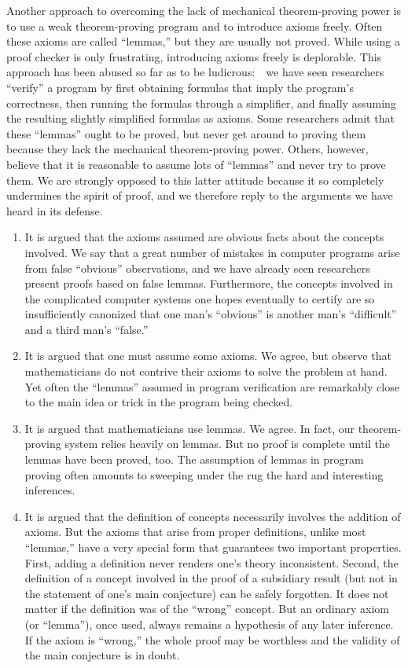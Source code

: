 \documentclass[11pt]{book}
\newenvironment{pubbullet}{\begin{enumerate}}{\end{enumerate}}
\begin{document}
Another approach to overcoming the lack of 
mechanical theorem-proving power is to use a weak theorem-proving program and to introduce axioms freely.
Often these axioms are  called ``lemmas,'' but they are
usually not  proved.  While using a proof checker is
only frustrating, introducing axioms freely is
deplorable.  
This approach has been abused so far as to be ludicrous:~~we have seen researchers ``verify''  a program
by first  obtaining formulas that imply the program's correctness,
then running the formulas
through a simplifier, and finally  assuming the resulting slightly simplified
formulas as axioms.  Some researchers admit
that these ``lemmas'' ought to be proved, but  never
get around to proving them because they lack the mechanical
theorem-proving power.  Others, however,  believe that
it is reasonable to assume lots of ``lemmas'' and never try
to prove them.  We are strongly opposed to this latter attitude
because it so completely undermines the spirit of
proof, and we therefore reply to the arguments
we have heard
in its defense.
\begin{pubbullet}
\item It is argued that the axioms assumed are obvious
facts about the concepts involved.  We say that a great number
of mistakes in computer programs arise from false ``obvious''
observations, and we have already seen  researchers
present proofs based on false lemmas.  Furthermore, the
concepts involved in the complicated computer systems
one hopes eventually to certify are so insufficiently
canonized that one man's ``obvious'' is another man's ``difficult''
and a third man's ``false.''
\item It is argued that one must assume some axioms.  We
agree, but observe that mathematicians do not contrive their
axioms to solve the problem at hand.  Yet often the ``lemmas''
assumed in program verification
are remarkably close to the main idea or trick in the
program being checked.
\item It is argued that
mathematicians use lemmas.  We agree. In fact,
our theorem-proving system relies heavily on lemmas.
But no proof is complete until 
the lemmas have  been proved, too.  The
assumption of lemmas in program proving often amounts to sweeping
under the rug the hard
and interesting inferences.
\item It is argued that the definition of concepts
necessarily involves the addition of axioms.
But the axioms that arise from proper definitions,
unlike most ``lemmas,'' have a very special form that
guarantees two important properties.
First, adding a definition never
renders one's theory inconsistent.  Second, the
definition of a  concept involved in the proof of a
subsidiary result (but not in the statement of
one's main conjecture) can be safely forgotten.
It does not matter if the definition was of the ``wrong''
concept.
But an ordinary axiom (or ``lemma''), once used, always remains
a hypothesis of any later inference.  If the
axiom is ``wrong,'' the whole proof may be worthless and
the validity of the main conjecture is in doubt.
\end{pubbullet}
\end{document}
